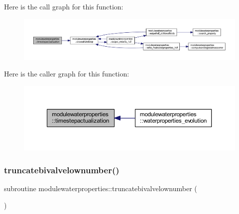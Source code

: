 Here is the call graph for this function\+:\nopagebreak
\begin{figure}[H]
\begin{center}
\leavevmode
\includegraphics[width=350pt]{namespacemodulewaterproperties_a96402f50a619ea1b6477bb32d13a9020_cgraph}
\end{center}
\end{figure}
Here is the caller graph for this function\+:\nopagebreak
\begin{figure}[H]
\begin{center}
\leavevmode
\includegraphics[width=350pt]{namespacemodulewaterproperties_a96402f50a619ea1b6477bb32d13a9020_icgraph}
\end{center}
\end{figure}
\mbox{\label{namespacemodulewaterproperties_ab62d1ee17d0bdd78beb327d8dd8c2f4d}} 
\subsubsection{\texorpdfstring{truncatebivalvelownumber()}{truncatebivalvelownumber()}}
{\footnotesize\ttfamily subroutine modulewaterproperties\+::truncatebivalvelownumber (\begin{DoxyParamCaption}{ }\end{DoxyParamCaption})\hspace{0.3cm}{\ttfamily [private]}}

